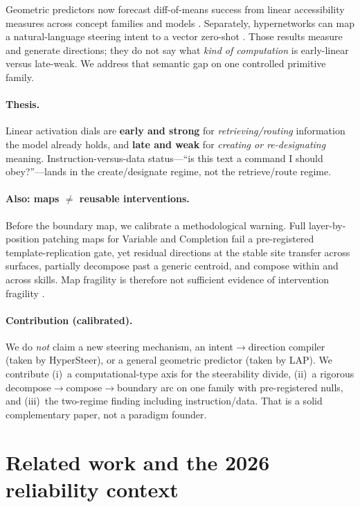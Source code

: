 \documentclass[10pt]{article}
\begin{document}
Geometric predictors now forecast diff-of-means success from linear
accessibility measures across concept families and models
\citep{lap2026predicting,geometriccanary2026,whensteerable2026}. Separately,
hypernetworks can map a natural-language steering intent to a vector
zero-shot \citep{sun2025hypersteer}. Those results measure and generate
directions; they do not say what \emph{kind of computation} is early-linear
versus late-weak. We address that semantic gap on one controlled primitive
family.

\paragraph{Thesis.}
Linear activation dials are \textbf{early and strong} for
\emph{retrieving/routing} information the model already holds, and
\textbf{late and weak} for \emph{creating or re-designating} meaning.
Instruction-versus-data status---``is this text a command I should obey?''---lands
in the create/designate regime, not the retrieve/route regime.

\paragraph{Also: maps $\neq$ reusable interventions.}
Before the boundary map, we calibrate a methodological warning. Full
layer-by-position patching maps for Variable and Completion fail a
pre-registered template-replication gate, yet residual directions at the
stable site transfer across surfaces, partially decompose past a generic
centroid, and compose within and across skills. Map fragility is therefore not
sufficient evidence of intervention fragility
\citep{hase2023localization,opielka2026invariance}.

\paragraph{Contribution (calibrated).}
We do \emph{not} claim a new steering mechanism, an intent$\to$direction
compiler (taken by HyperSteer), or a general geometric predictor (taken by
LAP). We contribute (i)~a computational-type axis for the steerability
divide, (ii)~a rigorous decompose$\to$compose$\to$boundary arc on one family
with pre-registered nulls, and (iii)~the two-regime finding including
instruction/data. That is a solid complementary paper, not a paradigm founder.

\section{Related work and the 2026 reliability context}
\end{document}
